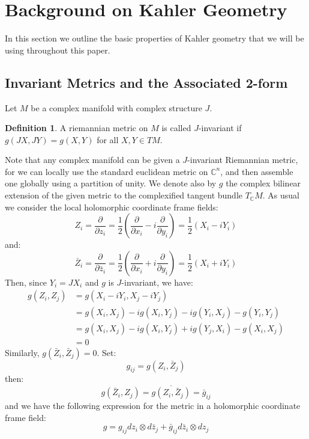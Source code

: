 \documentclass[11pt]{amsart}
\theoremstyle{definition}
\newtheorem{definition}[subsection]{Definition}
\def \C{ \mathbb{C} }
\def \del{ \partial }
\begin{document}
\section{ Background on Kahler Geometry }

In this section we outline the basic properties of Kahler geometry that we will be using throughout this paper.

\subsection{Invariant Metrics and the Associated 2-form }

Let $M$ be a complex manifold with complex structure $J$.
%
\begin{definition} A riemannian metric on $M$ is called $J$-invariant if $g(JX, JY) = g(X, Y)$ for all $X,Y \in TM$.
\end{definition}
%
Note that any complex manifold can be given a $J$-invariant Riemannian metric, for we can locally use the standard euclidean metric on $\C^n$, and then assemble one globally using a partition of unity.  
%
We denote also by $g$ the complex bilinear extension of the given metric to the complexified tangent bundle $T_{\C}M$.  As usual we consider the local holomorphic coordinate frame fields:
%
$$ Z_i = \frac{ \del }{ \del z_i } = \frac{1}{2} \left( \frac{ \del }{ \del x_i } - i \frac{ \del }{ \del y_i } \right) = \frac{1}{2}(X_i - i Y_i) $$
%
and:
%
$$\bar{Z}_i = \frac{ \del }{ \del \bar{z}_i } = \frac{1}{2} \left( \frac{ \del }{ \del x_i } + i \frac{ \del }{ \del y_i } \right) = \frac{1}{2} ( X_i + i Y_i ) $$
%
Then, since $Y_i = J X_i$ and $g$ is $J$-invariant, we have:
%
\begin{align*}
g(Z_i, Z_j) &= g( X_i - i Y_i, X_j - i Y_j ) \\
&= g( X_i, X_j ) - i g(X_i, Y_j) - i g(Y_i, X_j) - g(Y_i, Y_j) \\
&= g( X_i, X_j ) - i g(X_i, Y_j) + i g(Y_j, X_i) - g(X_i, X_j) \\
&= 0
\end{align*}
%
Similarly, $g( \bar{Z}_i, \bar{Z}_j ) = 0$.  
%
Set:
%
$$ g_{ij} = g( Z_i, \bar{Z}_j ) $$
%
then:
%
$$ g( \bar{Z}_i, Z_j ) = \overline{ g( Z_i, \bar{Z}_j ) } = \bar{g}_{ij} $$
%
and we have the following expression for the metric in a holomorphic coordinate frame field:
%
$$ g = g_{ij} d z_i \otimes d \bar{z}_j + \bar{g}_{ij} d \bar{z}_i \otimes d z_j $$
\end{document}
